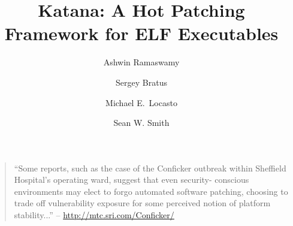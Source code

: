 \documentclass{IEEEtran}
\title{Katana: A Hot Patching Framework for ELF Executables}
\author[1]{Ashwin Ramaswamy}
\author[1]{Sergey Bratus}
\author[2]{Michael E.\ Locasto}
\author[1]{Sean W. Smith}
\affil[1]{Dartmouth College}
\affil[2]{George Mason University}
\begin{document}
\maketitle
\pagestyle{plain}



{\footnotesize
\begin{quote}
``Some reports, such as the case of the Conficker outbreak within 
Sheffield Hospital's operating ward, suggest that even security-
conscious environments may elect to forgo automated software patching, 
choosing to trade off vulnerability exposure for some perceived notion 
of platform stability...'' -- \url{http://mtc.sri.com/Conficker/}
\end{quote}
}











%







{\small


}
\end{document}
